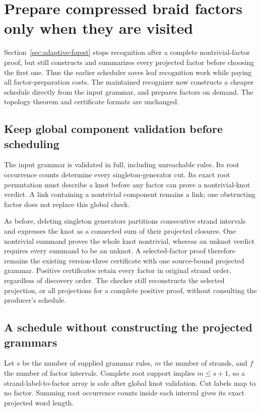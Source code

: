 \section{Prepare compressed braid factors only when they are visited}
\label{sec:lazy-forest}

Section~\ref{sec:adaptive-forest} stops recognition after a complete
nontrivial-factor proof, but still constructs and summarizes every projected
factor before choosing the first one. Thus the earlier scheduler saves
leaf recognition work while paying all factor-preparation costs. The
maintained recognizer now constructs a cheaper schedule directly from the
input grammar, and prepares factors on demand. The topology theorem and
certificate formats are unchanged.

\subsection{Keep global component validation before scheduling}

The input grammar is validated in full, including unreachable rules. Its
root occurrence counts determine every singleton-generator cut. Its exact
root permutation must describe a knot before any factor can prove a
nontrivial-knot verdict. A link containing a nontrivial component remains a
link; one obstructing factor does not replace this global check.

As before, deleting singleton generators partitions consecutive strand
intervals and expresses the knot as a connected sum of their projected
closures. One nontrivial summand proves the whole knot nontrivial, whereas
an unknot verdict requires every summand to be an unknot. A selected-factor
proof therefore remains the existing version-three certificate with one
source-bound projected grammar. Positive certificates retain every factor
in original strand order, regardless of discovery order. The checker still
reconstructs the selected projection, or all projections for a complete
positive proof, without consulting the producer's schedule.

\subsection{A schedule without constructing the projected grammars}

Let $s$ be the number of supplied grammar rules, $m$ the number of strands,
and $f$ the number of factor intervals. Complete root support implies
$m\le s+1$, so a strand-label-to-factor array is safe after global knot
validation. Cut labels map to no factor. Summing root occurrence counts
inside each interval gives its exact projected word length.

